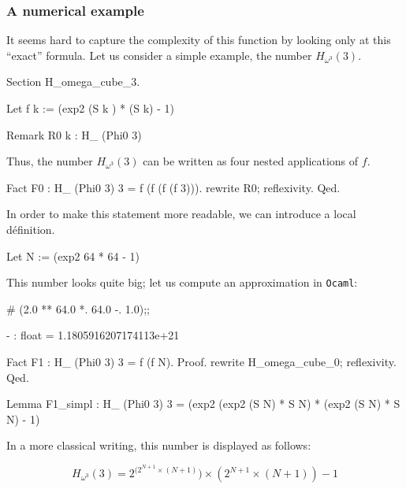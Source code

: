 \documentclass[a4paper]{book}
\begin{document}
\subsubsection{A numerical example}

It seems hard to capture the complexity of this function by looking only at this
``exact'' formula. 
Let us consider a simple example, the number $H_{\omega^3}(3)$.  

\begin{Coqsrc}
Section H_omega_cube_3.
  
Let f k :=   (exp2 (S k ) * (S k) - 1)%

Remark R0 k :  H_ (Phi0 3)%
\end{Coqsrc}

Thus, the number $H_{\omega^3}(3)$ can be written as four nested applications of $f$.

\begin{Coqsrc}
Fact F0 : H_ (Phi0 3) 3 = f (f (f (f 3))).
 rewrite R0; reflexivity. 
Qed.
\end{Coqsrc}

In order to make this statement more readable, we can introduce a local définition.

\begin{Coqsrc}
Let N := (exp2 64 * 64 - 1)%
\end{Coqsrc}

This number looks quite big; let us compute an approximation in \texttt{Ocaml}:


\begin{Coqsrc}
# (2.0 ** 64.0 *. 64.0 -. 1.0);; 
\end{Coqsrc}

\begin{Coqanswer}
- : float = 1.1805916207174113e+21
\end{Coqanswer}


\begin{Coqsrc}
Fact F1 : H_ (Phi0 3) 3 = f (f N).
Proof.
 rewrite H_omega_cube_0; reflexivity. 
Qed.


Lemma F1_simpl : H_ (Phi0 3) 3 =
                 (exp2 (exp2 (S N) * S N) * (exp2 (S N) * S N) - 1)%

\end{Coqsrc}


In a more classical writing, this number is displayed as follows:

{\Large
$$
H_{\omega^3}(3) =  2 ^ {(2 ^ {N + 1} \times (N+1) } )  \times  (2 ^ {N+1} \times ( N +1) ) - 1
$$
}
\end{document}
